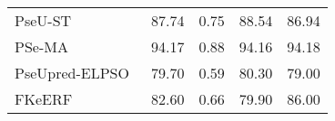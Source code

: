 \begin{tabular}{lcccc}
  PseU-ST~\cite{zhang_pseu-st_2023}              & 87.74             & 0.75         & 88.54            & 86.94            \\
  PSe-MA~\cite{patil_novel_2023}                 & 94.17             & 0.88         & 94.16            & 94.18            \\
  PseUpred-ELPSO~\cite{wang_pseupred-elpso_2024} & 79.70             & 0.59         & 80.30            & 79.00            \\
  FKeERF~\cite{chen_fuzzy_2024}                  & 82.60             & 0.66         & 79.90            & 86.00            \\
  \bottomrule
\end{tabular}